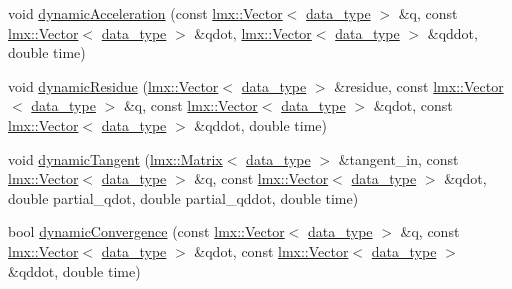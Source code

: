 \begin{DoxyCompactItemize}
\item 
void \hyperlink{classmknix_1_1_simulation_ace4ce2a959690e14c443b3c6e83c2690}{dynamic\+Acceleration} (const \hyperlink{classlmx_1_1_vector}{lmx\+::\+Vector}$<$ \hyperlink{namespacemknix_a16be4b246fbf2cceb141e3a179111020}{data\+\_\+type} $>$ \&q, const \hyperlink{classlmx_1_1_vector}{lmx\+::\+Vector}$<$ \hyperlink{namespacemknix_a16be4b246fbf2cceb141e3a179111020}{data\+\_\+type} $>$ \&qdot, \hyperlink{classlmx_1_1_vector}{lmx\+::\+Vector}$<$ \hyperlink{namespacemknix_a16be4b246fbf2cceb141e3a179111020}{data\+\_\+type} $>$ \&qddot, double time)
\item 
void \hyperlink{classmknix_1_1_simulation_ae78bef0d5f80665be4a0c2d926e99973}{dynamic\+Residue} (\hyperlink{classlmx_1_1_vector}{lmx\+::\+Vector}$<$ \hyperlink{namespacemknix_a16be4b246fbf2cceb141e3a179111020}{data\+\_\+type} $>$ \&residue, const \hyperlink{classlmx_1_1_vector}{lmx\+::\+Vector}$<$ \hyperlink{namespacemknix_a16be4b246fbf2cceb141e3a179111020}{data\+\_\+type} $>$ \&q, const \hyperlink{classlmx_1_1_vector}{lmx\+::\+Vector}$<$ \hyperlink{namespacemknix_a16be4b246fbf2cceb141e3a179111020}{data\+\_\+type} $>$ \&qdot, const \hyperlink{classlmx_1_1_vector}{lmx\+::\+Vector}$<$ \hyperlink{namespacemknix_a16be4b246fbf2cceb141e3a179111020}{data\+\_\+type} $>$ \&qddot, double time)
\item 
void \hyperlink{classmknix_1_1_simulation_a226a281591cb1b0bac253a3dcce19e5b}{dynamic\+Tangent} (\hyperlink{classlmx_1_1_matrix}{lmx\+::\+Matrix}$<$ \hyperlink{namespacemknix_a16be4b246fbf2cceb141e3a179111020}{data\+\_\+type} $>$ \&tangent\+\_\+in, const \hyperlink{classlmx_1_1_vector}{lmx\+::\+Vector}$<$ \hyperlink{namespacemknix_a16be4b246fbf2cceb141e3a179111020}{data\+\_\+type} $>$ \&q, const \hyperlink{classlmx_1_1_vector}{lmx\+::\+Vector}$<$ \hyperlink{namespacemknix_a16be4b246fbf2cceb141e3a179111020}{data\+\_\+type} $>$ \&qdot, double partial\+\_\+qdot, double partial\+\_\+qddot, double time)
\item 
bool \hyperlink{classmknix_1_1_simulation_a0bb5d6c4c6eccc35e892b710af40616f}{dynamic\+Convergence} (const \hyperlink{classlmx_1_1_vector}{lmx\+::\+Vector}$<$ \hyperlink{namespacemknix_a16be4b246fbf2cceb141e3a179111020}{data\+\_\+type} $>$ \&q, const \hyperlink{classlmx_1_1_vector}{lmx\+::\+Vector}$<$ \hyperlink{namespacemknix_a16be4b246fbf2cceb141e3a179111020}{data\+\_\+type} $>$ \&qdot, const \hyperlink{classlmx_1_1_vector}{lmx\+::\+Vector}$<$ \hyperlink{namespacemknix_a16be4b246fbf2cceb141e3a179111020}{data\+\_\+type} $>$ \&qddot, double time)
\item 

\end{DoxyCompactItemize}
